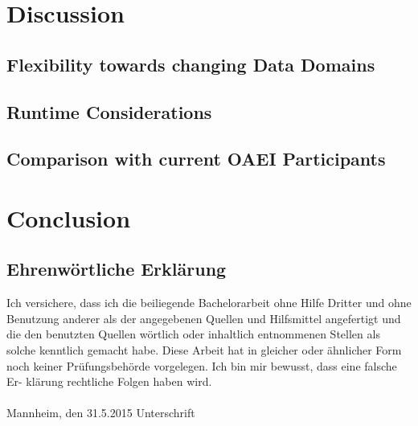 \documentclass[11pt,titlepage,oneside,openany,a4paper]{report}
\begin{document}

\chapter{Discussion}
\section{Flexibility towards changing Data Domains}
\section{Runtime Considerations}
\section{Comparison with current OAEI Participants}


\chapter{Conclusion}


\clearpage
\newpage







\newpage

\pagestyle{empty}


\section*{Ehrenw\"ortliche Erkl\"arung}
Ich versichere, dass ich die beiliegende Bachelorarbeit ohne Hilfe Dritter
und ohne Benutzung anderer als der angegebenen Quellen und Hilfsmittel
angefertigt und die den benutzten Quellen w\"ortlich oder inhaltlich
entnommenen Stellen als solche kenntlich gemacht habe. Diese Arbeit
hat in gleicher oder \"ahnlicher Form noch keiner Pr\"ufungsbeh\"orde
vorgelegen. Ich bin mir bewusst, dass eine falsche Er- kl\"arung rechtliche Folgen haben
wird.
\\
\\

\noindent
Mannheim, den 31.5.2015 \hspace{4cm} Unterschrift
\end{document}
